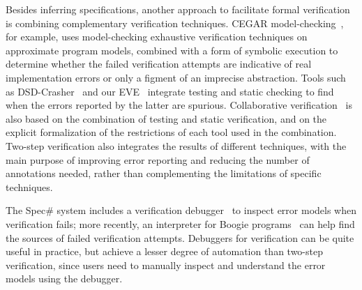 Besides inferring specifications, another approach to facilitate formal verification is combining complementary verification techniques.
CEGAR model-checking~\cite{BEYER07}, for example, uses model-checking exhaustive verification techniques on approximate program models, combined with a form of symbolic execution to determine whether the failed verification attempts are indicative of real implementation errors or only a figment of an imprecise abstraction.
Tools such as DSD-Crasher~\cite{CSALLNER08} and our EVE~\cite{TSCHANNEN11} integrate testing and static checking to find when the errors reported by the latter are spurious.
Collaborative verification~\cite{CHRISTAKIS12} is also based on the combination of testing and static verification, and on the explicit formalization of the restrictions of each tool used in the combination.
Two-step verification also integrates the results of different techniques, with the main purpose of improving error reporting and reducing the number of annotations needed, rather than complementing the limitations of specific techniques.

The Spec\# system includes a verification debugger~\cite{MOSKAL11} to inspect error models when verification fails; more recently, an interpreter for Boogie programs~\cite{POLIKARPOVA13} can help find the sources of failed verification attempts.
Debuggers for verification can be quite useful in practice, but achieve a lesser degree of automation than two-step verification, since users need to manually inspect and understand the error models using the debugger.


